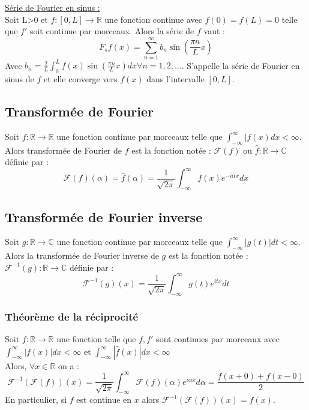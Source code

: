 \documentclass[../main.tex]{subfiles}
\begin{document}
\quad \underline{Série de Fourier en sinus :}\\
Soit L>0 et $f:[0,L]\rightarrow \mathbb{R}$ une fonction continue avec $f(0) = f(L) = 0$ telle que $f'$ soit continue par morceaux. Alors la série de $f$ vaut :\\
\begin{equation}
    F_s f(x) = \sum_{n=1}^{\infty} b_n \sin(\frac{\pi n}{L}x)
\end{equation}
Avec $b_n = \frac{2}{L} \int_0^L f(x) \sin(\frac{\pi n}{L}x)dx \forall n=1,2,\dots$. S'appelle la série de Fourier en sinus de $f$ et elle converge vers $f(x)$ dans l'intervalle $[0,L]$.\\

\subsection{Transformée de Fourier}
Soit $f:\mathbb{R} \rightarrow \mathbb{R}$ une fonction continue par morceaux telle que $\int_{-\infty}^{\infty} |f(x)dx <\infty$. Alors transformée de Fourier de $f$ est la fonction notée : $\mathcal{F}(f)$ ou $\hat{f}:\mathbb{R} \rightarrow \mathbb{C}$ définie par :\\
\begin{equation}
    \mathcal{F}(f)(\alpha) = \hat{f}(\alpha) = \frac{1}{\sqrt{2\pi}}\int_{-\infty}^{\infty} f(x) e^{-i\alpha x}dx
\end{equation}

\subsection{Transformée de Fourier inverse}
Soit $g:\mathbb{R} \rightarrow \mathbb{C}$ une fonction continue par morceaux telle que $\int_{-\infty}^{\infty} |g(t)|dt < \infty$. Alors la transformée de Fourier inverse de $g$ est la fonction notée :$\mathcal{F}^{-1}(g) : \mathbb{R}\rightarrow \mathbb{C}$ définie par :\\
\begin{equation}
    \mathcal{F}^{-1}(g)(x) = \frac{1}{\sqrt{2\pi}} \int_{-\infty}^{\infty}g(t) e^{itx}dt
\end{equation}

\subsubsection{Théorème de la réciprocité}
Soit $f:\mathbb{R}\rightarrow \mathbb{R}$ une fonction telle que $f, f'$ sont continues par morceaux avec $\int_{-\infty}^{\infty} |f(x)|dx < \infty$ et $\int_{-\infty}^{\infty} |\hat{f}(x)|dx < \infty$\\
Alors, $\forall x\in \mathbb{R}$ on a :\\
\begin{equation}
    \mathcal{F}^{-1}(\mathcal{F}(f))(x) = \frac{1}{\sqrt{2\pi}} \int_{-\infty}^{\infty} \mathcal{F}(f)(\alpha) e^{i\alpha x}d\alpha = \frac{f(x+0)+f(x-0)}{2}
\end{equation}
En particulier, si $f$ est continue en $x$ alors $\mathcal{F}^{-1}(\mathcal{F}(f))(x) = f(x)$.\\
\end{document}
